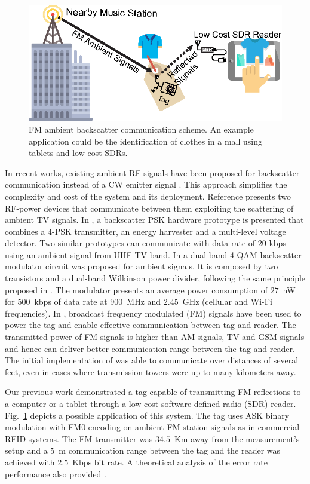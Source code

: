 \documentclass[journal]{IEEEtran}
\begin{document}
\begin{figure}[t]
\centering
\includegraphics[width=0.85\columnwidth]{Figures/Fig1.eps}
\caption{FM ambient backscatter communication scheme. An example application  could be the identification of clothes in a mall using tablets and low cost SDRs.}
\label{fig:consept}
\end{figure}
%
In recent works,   existing ambient RF signals  have been proposed for backscatter communication instead of a CW emitter signal  \cite{liu2013ambient, van2017ambient}. This approach simplifies the complexity and cost of the system and its deployment.
%
Reference \cite{liu2013ambient} presents two RF-power devices that communicate between them exploiting the scattering of ambient TV signals.
%
In  \cite{qian2018iot}, a backscatter PSK hardware prototype is presented that combines a $4$-PSK transmitter, an energy harvester and a multi-level voltage detector. 
%
Two similar prototypes can communicate  with data rate of $20$
kbps using an ambient signal from UHF TV band.
%
In \cite{correia2018dual} a dual-band 4-QAM backscatter modulator circuit was proposed for ambient signals. 
%
It is composed by two transistors and a dual-band Wilkinson power divider, following the same principle proposed in \cite{correia2017quadrature}.
%
The  modulator presents an average power consumption of
$27$~nW for $500$~kbps of data rate at $900$~MHz and
$2.45$~GHz (cellular and Wi-Fi frequencies).
%
In \cite{wang2017fm}, broadcast frequency modulated (FM) signals have been used to power the tag and  enable effective communication between tag and reader. 
%
The transmitted power of FM signals is higher than AM signals, TV and GSM signals and hence can deliver better communication range between the tag and reader.
%
The initial implementation of \cite{wang2017fm} was able to communicate over distances of several feet, even in cases where transmission towers were up to many kilometers away. 
%

Our previous work \cite{daskalakis2017ambient} demonstrated a tag  capable of transmitting FM reflections  to a computer or a tablet through a low-cost software defined radio (SDR) reader.
%
Fig.~\ref{fig:consept} depicts a possible application of this system. 
%
The tag uses ASK binary modulation with FM0 encoding on ambient FM station signals as in commercial RFID systems. 
%
The FM transmitter was $34.5$~Km away from the measurement's setup and a $5$~m communication range between the tag and the reader was achieved with $2.5$~Kbps bit rate. 
%
A theoretical analysis of the error rate performance  also provided \cite{daskalakis2017ambient}.
%
\end{document}
